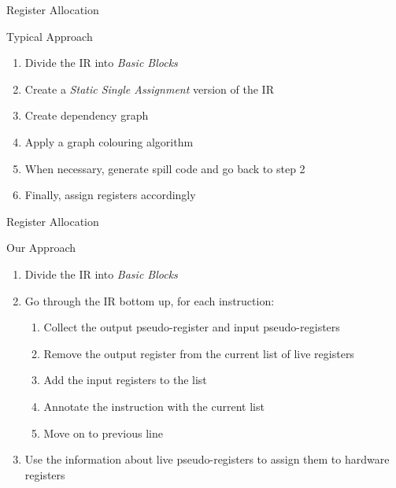 \documentclass[department=icis, slidenumbers=slide, official=true]{beamerruhuisstijl}
\begin{document}
\begin{frame}{Register Allocation}
    \begin{block}{Typical Approach}
    \begin{enumerate}[<+->]
        \item Divide the IR into \emph{Basic Blocks}
        \item Create a \emph{Static Single Assignment} version of the IR
        \item Create dependency graph
        \item Apply a graph colouring algorithm
        \item When necessary, generate spill code and go back to step 2
        \item Finally, assign registers accordingly
    \end{enumerate}
    \end{block}
    \vspace{2em}

\end{frame}

\begin{frame}{Register Allocation}
    \begin{block}{Our Approach}
        \begin{enumerate}[<+->]
            \item Divide the IR into \emph{Basic Blocks}
            \item Go through the IR bottom up, for each instruction:
                \begin{enumerate}
                    \item Collect the output pseudo-register and input pseudo-registers
                    \item Remove the output register from the current list of live registers
                    \item Add the input registers to the list
                    \item Annotate the instruction with the current list
                    \item Move on to previous line
                \end{enumerate}
            \item Use the information about live pseudo-registers to assign them to hardware registers
        \end{enumerate}
    \end{block}
\end{frame}
\end{document}
